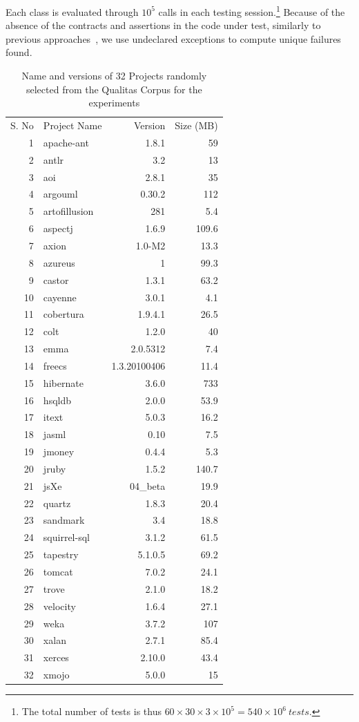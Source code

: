 \documentclass{acm_proc_article-sp}
\begin{document}
Each class is evaluated through $10^5$ calls in each testing session.\footnote{The total number of tests is thus $60\times 30\times 3 \times 10^5 = 540\times 10^6~tests$.} 
Because of the absence of the contracts and assertions in the code under test, similarly to previous approaches~\cite{Oriol2012}, we use undeclared exceptions to compute unique failures found.


\begin{table}[h]
\caption{Name and versions of 32 Projects randomly selected from the Qualitas Corpus for the experiments}
\centering
\begin{tabular}{rlrr}
S. No& 	Project Name	& 	Version		&	Size (MB)\\
1	&	apache-ant	&	1.8.1			&	59\\
2	&	antlr			&	3.2			&	13\\
3	&	aoi			&	2.8.1			&	35\\
4	&	argouml		&	0.30.2		&	112\\
5	&	artofillusion	&	281			&	5.4\\
6	&	aspectj		&	1.6.9			&	109.6\\
7	&	axion		&	1.0-M2		&	13.3\\
8	&	azureus		&	1			&	99.3\\
9	&	castor		&	1.3.1			&	63.2\\
10	&	cayenne		&	3.0.1			&	4.1\\
11	&	cobertura		&	1.9.4.1		&	26.5\\
12	&	colt			&	1.2.0			&	40\\
13	&	emma		&	2.0.5312		&	7.4\\
14	&	freecs		&	1.3.20100406	&	11.4\\
15	&	hibernate		&	3.6.0			&	733\\
16	&	hsqldb		&	2.0.0			&	53.9\\
17	&	itext			&	5.0.3			&	16.2\\
18	&	jasml		&	0.10			&	7.5 \\
19	&	jmoney		&	0.4.4			&	5.3\\
20	&	jruby			&	1.5.2			&	140.7\\
21	&	jsXe			&	04\_beta		&	19.9\\
22	&	quartz		&	1.8.3			&	20.4\\
23	&	sandmark		&	3.4			&	18.8\\
24	&	squirrel-sql	&	3.1.2			&	61.5\\
25	&	tapestry		&	5.1.0.5		&	69.2\\
26	&	tomcat		&	7.0.2			&	24.1\\
27	&	trove			&	2.1.0			&	18.2\\
28	&	velocity		&	1.6.4			&	27.1\\
29	&	weka		&	3.7.2			&	107\\
30	&	xalan		&	2.7.1			&	85.4\\
31	&	xerces		&	2.10.0		&	43.4\\
32	&	xmojo		&	5.0.0			&	15\\
\end{tabular}
\bigskip
\label{table:projects}
\end{table}
\end{document}
